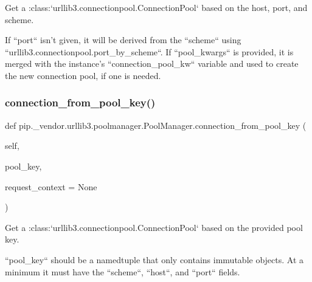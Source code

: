 \begin{DoxyVerb}Get a :class:`urllib3.connectionpool.ConnectionPool` based on the host, port, and scheme.

If ``port`` isn't given, it will be derived from the ``scheme`` using
``urllib3.connectionpool.port_by_scheme``. If ``pool_kwargs`` is
provided, it is merged with the instance's ``connection_pool_kw``
variable and used to create the new connection pool, if one is
needed.
\end{DoxyVerb}
 \mbox{\label{classpip_1_1__vendor_1_1urllib3_1_1poolmanager_1_1PoolManager_aec90b429d0fd092fe7baaeef721088e4}} 
\subsubsection{\texorpdfstring{connection\+\_\+from\+\_\+pool\+\_\+key()}{connection\_from\_pool\_key()}}
{\footnotesize\ttfamily def pip.\+\_\+vendor.\+urllib3.\+poolmanager.\+Pool\+Manager.\+connection\+\_\+from\+\_\+pool\+\_\+key (\begin{DoxyParamCaption}\item[{}]{self,  }\item[{}]{pool\+\_\+key,  }\item[{}]{request\+\_\+context = {\ttfamily None} }\end{DoxyParamCaption})}

\begin{DoxyVerb}Get a :class:`urllib3.connectionpool.ConnectionPool` based on the provided pool key.

``pool_key`` should be a namedtuple that only contains immutable
objects. At a minimum it must have the ``scheme``, ``host``, and
``port`` fields.
\end{DoxyVerb}
 \mbox{\label{classpip_1_1__vendor_1_1urllib3_1_1poolmanager_1_1PoolManager_ad3a3b301f8ce97a6a6904ac76dc31bd8}} 
